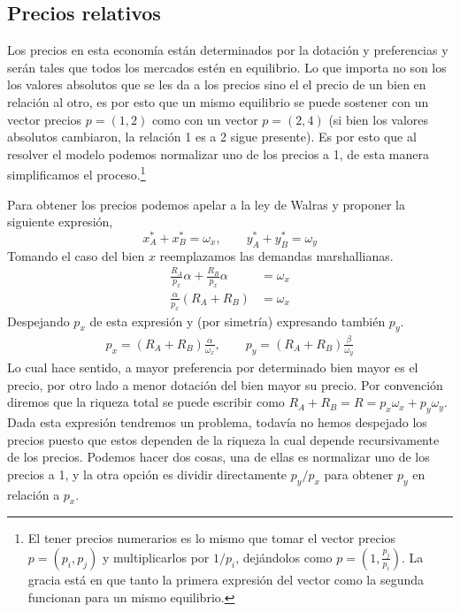 \subsection{Precios relativos}

Los precios en esta economía están determinados por la dotación y preferencias y serán tales que todos los mercados estén en equilibrio. Lo que importa no son los los valores absolutos que se les da a los precios sino el el precio de un bien en relación al otro, es por esto que un mismo equilibrio se puede sostener con un vector precios $p=(1,2)$ como con un vector $p=(2,4)$ (si bien los valores absolutos cambiaron, la relación 1 es a 2 sigue presente). Es por esto que al resolver el modelo podemos normalizar uno de los precios a 1, de esta manera  simplificamos el proceso.\footnote{El tener precios numerarios es lo mismo que tomar el vector precios $p = (p_i,p_j)$ y multiplicarlos por $1/p_i$, dejándolos como $p = (1, \frac{p_j}{p_i})$. La gracia está en que tanto la primera expresión del vector como la segunda funcionan para un mismo equilibrio.} 

Para obtener los precios podemos apelar a la ley de Walras y proponer la siguiente expresión,
\begin{equation*}
    x_A^* + x_B^* = \omega_x, \quad \quad y_A^* + y_B^* = \omega_y
\end{equation*}
Tomando el caso del bien $x$ reemplazamos las demandas marshallianas.
\begin{align*}
   \frac{R_A}{p_x} \alpha + \frac{R_B}{p_x} \alpha  &= \omega_x \\
   \frac{\alpha}{p_x} (R_A + R_B) &= \omega_x
\end{align*}
Despejando $p_x$ de esta expresión y (por simetría) expresando también $p_y$.
\begin{align*}
    p_x = (R_A + R_B)\frac{\alpha}{\omega_x}, \quad \quad p_y = (R_A + R_B)\frac{\beta}{\omega_y}
\end{align*}
Lo cual hace sentido, a mayor preferencia por determinado bien mayor es el precio, por otro lado a menor dotación del bien mayor su precio. Por convención diremos que la riqueza total se puede escribir como $R_A + R_B = R = p_x\omega_x + p_y\omega_y$. Dada esta expresión tendremos un problema, todavía no hemos despejado los precios puesto que estos dependen de la riqueza la cual depende recursivamente de los precios. Podemos hacer dos cosas, una de ellas es normalizar uno de los precios a 1, y la otra opción es dividir directamente $p_y/p_x$ para obtener $p_y$ en relación a $p_x$. 


